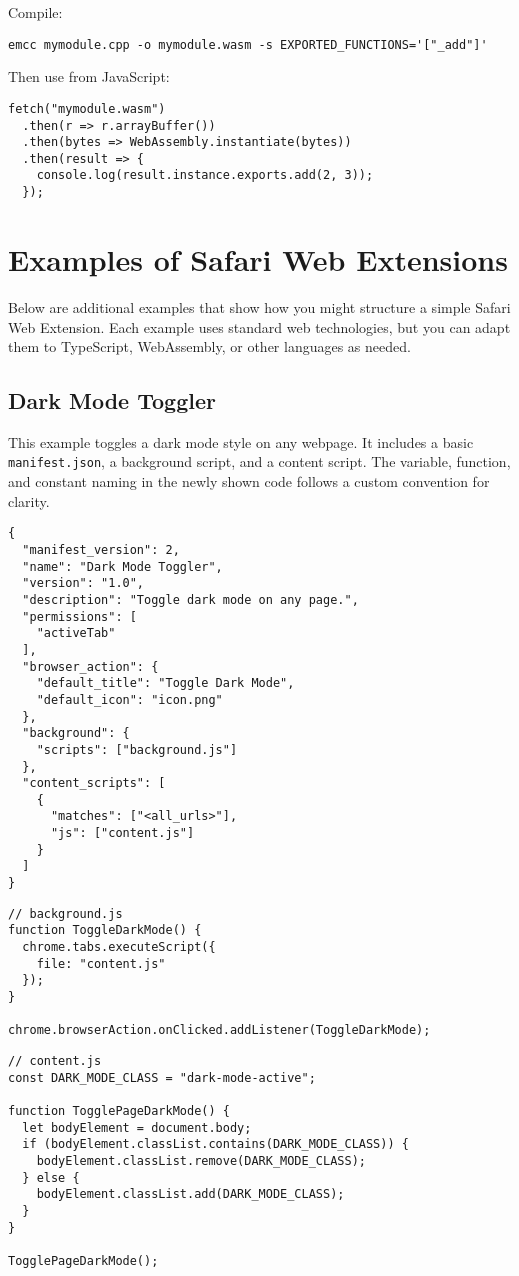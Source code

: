 \documentclass[12pt,a4paper]{article}
\begin{document}
Compile:
\begin{verbatim}
emcc mymodule.cpp -o mymodule.wasm -s EXPORTED_FUNCTIONS='["_add"]'
\end{verbatim}

Then use from JavaScript:
\begin{verbatim}
fetch("mymodule.wasm")
  .then(r => r.arrayBuffer())
  .then(bytes => WebAssembly.instantiate(bytes))
  .then(result => {
    console.log(result.instance.exports.add(2, 3));
  });
\end{verbatim}

\section{Examples of Safari Web Extensions}
Below are additional examples that show how you might structure a simple Safari Web Extension. Each example uses standard web technologies, but you can adapt them to TypeScript, WebAssembly, or other languages as needed.

\subsection{Dark Mode Toggler}
This example toggles a dark mode style on any webpage. It includes a basic \texttt{manifest.json}, a background script, and a content script. The variable, function, and constant naming in the newly shown code follows a custom convention for clarity.

\begin{verbatim}
{
  "manifest_version": 2,
  "name": "Dark Mode Toggler",
  "version": "1.0",
  "description": "Toggle dark mode on any page.",
  "permissions": [
    "activeTab"
  ],
  "browser_action": {
    "default_title": "Toggle Dark Mode",
    "default_icon": "icon.png"
  },
  "background": {
    "scripts": ["background.js"]
  },
  "content_scripts": [
    {
      "matches": ["<all_urls>"],
      "js": ["content.js"]
    }
  ]
}
\end{verbatim}

\begin{verbatim}
// background.js
function ToggleDarkMode() {
  chrome.tabs.executeScript({
    file: "content.js"
  });
}

chrome.browserAction.onClicked.addListener(ToggleDarkMode);
\end{verbatim}

\begin{verbatim}
// content.js
const DARK_MODE_CLASS = "dark-mode-active";

function TogglePageDarkMode() {
  let bodyElement = document.body;
  if (bodyElement.classList.contains(DARK_MODE_CLASS)) {
    bodyElement.classList.remove(DARK_MODE_CLASS);
  } else {
    bodyElement.classList.add(DARK_MODE_CLASS);
  }
}

TogglePageDarkMode();
\end{verbatim}
\end{document}

